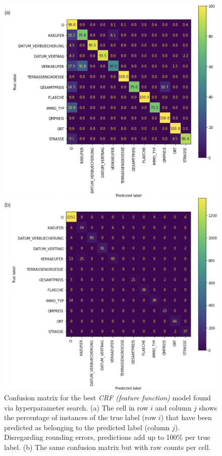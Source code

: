 \documentclass[11pt]{article}
\begin{document}
\begin{figure}[h!]\centering\includegraphics[width=\linewidth]{confMat.png}
\caption{Confusion matrix for the best \emph{CRF (feature function)} model found via hyperparameter search. (a) The cell in row $i$ and column $j$ shows the percentage of instances of the true label (row $i$) that have been predicted as belonging to  the predicted label (column $j$). Disregarding rounding errors, predictions add up to 100\% per true label. (b) The same confusion matrix but with raw counts per cell.}
\label{confMat}
\end{figure}
\end{document}
